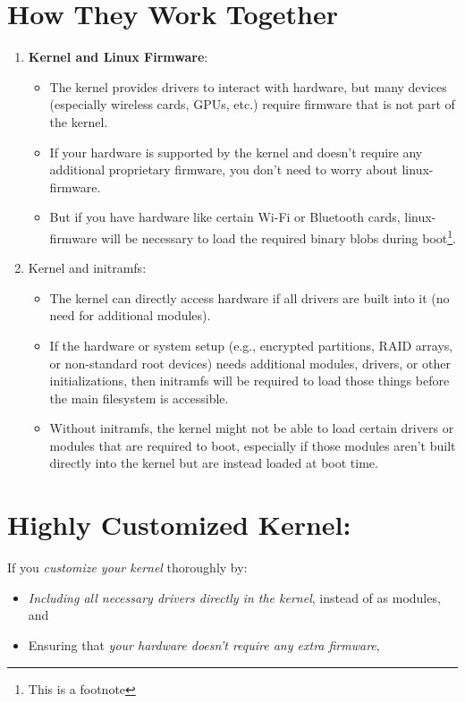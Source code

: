 \section{How They Work Together}
\begin{enumerate}
  \item \textbf{Kernel and Linux Firmware}:
    \begin{itemize}
        \item The kernel provides drivers to interact with hardware, but many devices (especially wireless cards, GPUs, etc.) require firmware that is not part of the kernel.
        \item If your hardware is supported by the kernel and doesn't require any additional proprietary firmware, you don’t need to worry about linux-firmware.
        \item But if you have hardware like certain Wi-Fi or Bluetooth cards, linux-firmware will be necessary to load the required binary blobs during boot\footnote{This is a footnote}.
    \end{itemize}
\item Kernel and initramfs:
    \begin{itemize}
        \item The kernel can directly access hardware if all drivers are built into it (no need for additional modules).
        \item If the hardware or system setup (e.g., encrypted partitions, RAID arrays, or non-standard root devices) needs additional modules, drivers, or other initializations, then initramfs will be required to load those things before the main filesystem is accessible.
        \item Without initramfs, the kernel might not be able to load certain drivers or modules that are required to boot, especially if those modules aren’t built directly into the kernel but are instead loaded at boot time.
    \end{itemize}
\end{enumerate}

\section{Highly Customized Kernel:}
If you \textit{customize your kernel} thoroughly by:
\begin{itemize}
  \item \textit{Including all necessary drivers directly in the kernel}, instead of as modules, and
  \item Ensuring that \textit{your hardware doesn't require any extra firmware},
\end{itemize}

